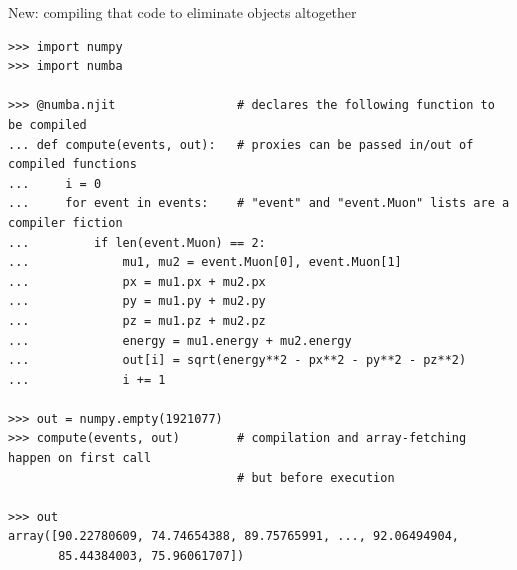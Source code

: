\documentclass[aspectratio=169]{beamer}
\begin{document}
\begin{frame}[fragile]{New: compiling that code to eliminate objects altogether}
\vspace{0.15 cm}
\scriptsize
\begin{verbatim}
>>> import numpy
>>> import numba

>>> @numba.njit                 # declares the following function to be compiled
... def compute(events, out):   # proxies can be passed in/out of compiled functions
...     i = 0
...     for event in events:    # "event" and "event.Muon" lists are a compiler fiction
...         if len(event.Muon) == 2:
...             mu1, mu2 = event.Muon[0], event.Muon[1]
...             px = mu1.px + mu2.px
...             py = mu1.py + mu2.py
...             pz = mu1.pz + mu2.pz
...             energy = mu1.energy + mu2.energy
...             out[i] = sqrt(energy**2 - px**2 - py**2 - pz**2)
...             i += 1

>>> out = numpy.empty(1921077)
>>> compute(events, out)        # compilation and array-fetching happen on first call
                                # but before execution

>>> out
array([90.22780609, 74.74654388, 89.75765991, ..., 92.06494904,
       85.44384003, 75.96061707])
\end{verbatim}
\end{frame}
\end{document}

